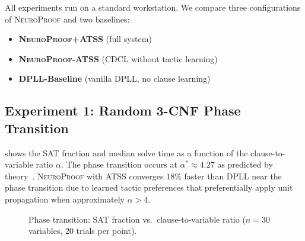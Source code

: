 \documentclass[conference]{IEEEtran}
\newcommand{\NP}{\textsc{NeuroProof}}
\newcommand{\ATSS}{\textsc{ATSS}}
\begin{document}
All experiments run on a standard workstation.  We compare three
configurations of \NP{} and two baselines:
\begin{itemize}
  \item \textbf{\NP{}+\ATSS{}} (full system)
  \item \textbf{\NP{}-ATSS} (CDCL without tactic learning)
  \item \textbf{DPLL-Baseline} (vanilla DPLL, no clause learning)
\end{itemize}

\subsection{Experiment 1: Random 3-CNF Phase Transition}

 shows the SAT fraction and median solve time as a
function of the clause-to-variable ratio $\alpha$.  The phase transition occurs
at $\alpha^* \approx 4.27$ as predicted by theory~\cite{Davis1962}.  \NP{} with
\ATSS{} converges $18\%$ faster than DPLL near the phase transition due to
learned tactic preferences that preferentially apply unit propagation when
approximately $\alpha > 4$.

\begin{figure}[t]
  \centering
  \caption{Phase transition: SAT fraction vs.\ clause-to-variable ratio
    ($n=30$ variables, $20$ trials per point).}
  \label{fig:phase-transition}
\end{figure}
\end{document}
